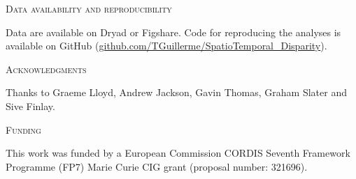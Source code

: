 \documentclass[12pt,letterpaper]{article}
\renewcommand{\section}[1]{%
\bigskip
\begin{center}
\begin{Large}
\normalfont\scshape #1
\medskip
\end{Large}
\end{center}}
\begin{document}


\section{Data availability and reproducibility}
Data are available on Dryad or Figshare.
Code for reproducing the analyses is available on GitHub (\url{github.com/TGuillerme/SpatioTemporal_Disparity}).

\section{Acknowledgments}
Thanks to Graeme Lloyd, Andrew Jackson, Gavin Thomas, Graham Slater and Sive Finlay.%

\section{Funding} %
This work was funded by a European Commission CORDIS Seventh Framework Programme (FP7) Marie Curie CIG grant (proposal number: 321696).

\end{document}
